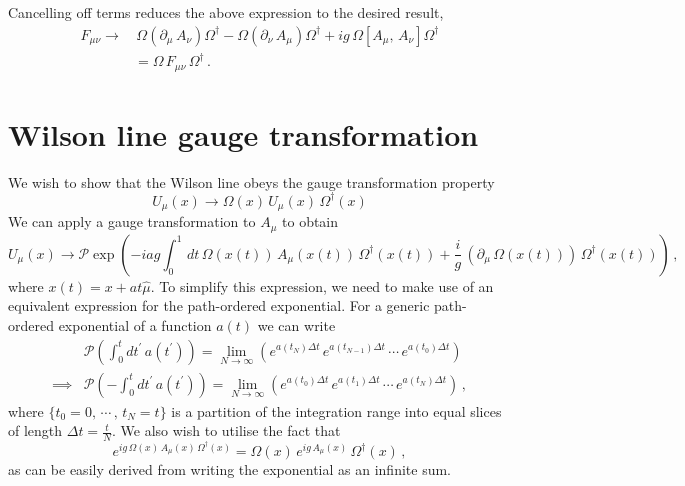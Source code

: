 Cancelling off terms reduces the above expression to the desired result,
%
\begin{align}
F_{\mu\nu} \rightarrow &\, \Omega\left(\partial_\mu\,A_\nu\right)\Omega^\dagger - \Omega\left(\partial_\nu\,A_\mu\right)\Omega^\dagger +ig\,\Omega\left[A_\mu,\,A_\nu\right]\Omega^\dagger\nonumber\\
&= \Omega\,F_{\mu\nu}\,\Omega^\dagger\, .
\end{align}

\section{Wilson line gauge transformation}\label{app:WilsonLineGT}

We wish to show that the Wilson line obeys the gauge transformation property
%
\begin{equation}
U_\mu(x) \rightarrow \Omega(x)\,U_\mu(x)\,\Omega^\dagger(x)
\end{equation}
%
We can apply a gauge transformation to $A_\mu$ to obtain
%
\begin{equation}
U_\mu(x)\rightarrow\mathcal{P}\exp\left(-iag\int_0^1\,dt\, \Omega(x(t))\,A_\mu(x(t))\,\Omega^\dagger(x(t)) + \frac{i}{g}\,(\partial_\mu\,\Omega(x(t)))\,\Omega^\dagger(x(t))\right)\, ,
\label{eq:WilsonLineGT(app)}
\end{equation}
%
where $x(t)=x+at\hat{\mu}$. To simplify this expression, we need to make use of an equivalent expression for the path-ordered exponential. For a generic path-ordered exponential of a function $a(t)$ we can write
%
\begin{align}
&\mathcal{P}\left(\int_0^t dt^\prime\, a(t^\prime)\right) = \lim_{N\rightarrow\infty} \left( e^{a(t_N)\Delta t}\,e^{a(t_{N-1})\Delta t}\,\cdots\,e^{a(t_0)\Delta t}\right)\nonumber\\
\implies &\mathcal{P}\left(-\int_0^t dt^\prime\, a(t^\prime)\right) = \lim_{N\rightarrow\infty} \left( e^{a(t_0)\Delta t}\,e^{a(t_{1})\Delta t}\,\cdots\,e^{a(t_N)\Delta t}\right)\, , \label{eq:OrderedExponentialLimit}
\end{align}
%
where $\lbrace t_0 = 0, \, \cdots\, , \, t_N = t\rbrace$ is a partition of the integration range into equal slices of length $\Delta t = \frac{t}{N}$. We also wish to utilise the fact that
%
\begin{equation}
e^{ig\,\Omega(x)\,A_\mu(x)\,\Omega^\dagger(x)} = \Omega(x)\,e^{ig\,A_\mu(x)}\,\Omega^\dagger(x)\, ,
\end{equation}
as can be easily derived from writing the exponential as an infinite sum.\\

